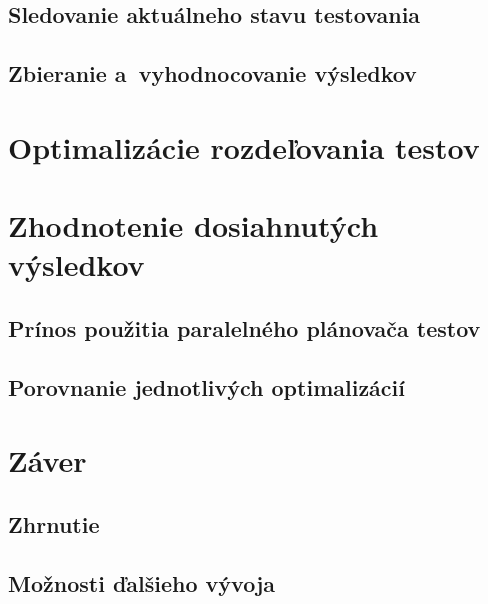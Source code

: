 \section{Sledovanie aktuálneho stavu testovania}
\label{sekcia:sledovanie_stavu}

\section{Zbieranie a~vyhodnocovanie výsledkov}
\label{sekcia:zbieranie_vysledkov}




%
%
\chapter{Optimalizácie rozdeľovania testov}
\label{kapitola:optimalizacie}




%
%
\chapter{Zhodnotenie dosiahnutých výsledkov}
\label{kapitola:zhodnotenie_vysledkov}

\section{Prínos použitia paralelného plánovača testov}
\label{sekcia:prinos_pouzitia}

\section{Porovnanie jednotlivých optimalizácií}
\label{sekcia:porovnanie_optimalizacii}

%
%
\chapter{Záver}
\label{kapitola:zaver}

\section{Zhrnutie}
\label{sekcia:zhrnutie}

\section{Možnosti ďalšieho vývoja}
\label{sekcia:moznosti_dalsieho_vyvoja}
